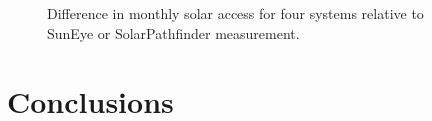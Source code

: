 \documentclass[twocolumn,10pt]{asme2ej}
\begin{document}
\begin{figure}[h!]
\begin{center}
\end{center}
\caption{Difference in monthly solar access for four systems relative to SunEye or SolarPathfinder measurement.}
\label{fig:monthly_solar_access_error}
\end{figure}


\section{Conclusions}
\end{document}
